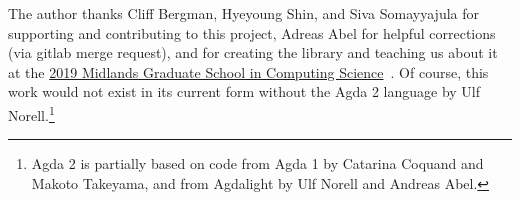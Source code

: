 The author thanks Cliff Bergman, Hyeyoung Shin, and Siva Somayyajula for supporting and contributing to this project, Adreas Abel for helpful corrections (via gitlab merge request), and \MartinEscardo for creating the \TypeTopology library and teaching us about it at the \href{http://events.cs.bham.ac.uk/mgs2019/}{2019 Midlands Graduate School in Computing Science}~\cite{MHE}. Of course, this work would not exist in its current form without the Agda 2 language by Ulf Norell.\footnote{Agda 2 is partially based on code from Agda 1 by Catarina Coquand and Makoto Takeyama, and from Agdalight by Ulf Norell and Andreas Abel.}
